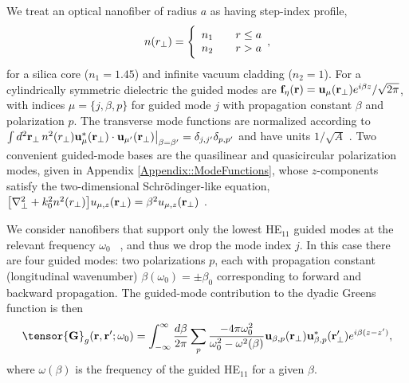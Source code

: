 \documentclass[preprint, aps,pra,onecolumn]{revtex4-1} %
\newcommand{\fidx}{\eta}
\newcommand{\eigenf}{\mbf{f}_\fidx}
\begin{document}
We treat an optical nanofiber of radius $a$ as having step-index profile,
	\begin{align} \label{Eq::IndexofRefraction}
		n(r_\perp) = \Bigg\{  
			\begin{array}{l l} n_1 & \quad r \leq a \\
						 n_2 & \quad r > a 
		\end{array},
	\end{align}
for a silica core ($n_1 = 1.45$) and infinite vacuum cladding ($n_2 = 1$).  For a cylindrically symmetric dielectric the guided modes are $\eigenf (\br) = \mathbf{u}_\mu (\br_\perp) e^{i\beta z}/\sqrt{2 \pi}$, with indices $\mu=\{j, \beta, p\}$ for guided mode $j$ with propagation constant $\beta$ and polarization $p$.  The transverse mode functions are normalized according to $\int d^2 \mathbf{r}_\perp \, n^2(r_\perp)\mathbf{u}^*_\mu (\mathbf{r}_\perp) \cdot \mathbf{u}_{\mu'} (\mathbf{r}_\perp)\big|_{\beta = \beta'} = \delta_{j,j'}\delta_{p,p'}$ and have units $1/\sqrt{A}$ \cite{le_kien_anisotropy_2014}.  Two convenient guided-mode bases are the quasilinear and quasicircular polarization modes, given in  Appendix \ref{Appendix::ModeFunctions}, whose $z$-components satisfy the two-dimensional Schr\"{o}dinger-like equation, $\big[\nabla_\perp^2 +k_0^2 n^2(r_\perp) \big] u_{\mu,z} (\mathbf{r}_\perp) = \beta^2 u_{\mu,z} (\mathbf{r}_\perp)$ \cite{kien_field_2004}.  

We consider nanofibers that support only the lowest HE$_{11}$ guided modes at the relevant frequency $\omega_0$ ~\cite{Yariv}, and thus we drop the mode index $j$.  In this case there are four guided modes: two polarizations $p$, each with propagation constant (longitudinal wavenumber) $\beta(\omega_0) = \pm\beta_0$ corresponding to forward and backward propagation.  The guided-mode contribution to the dyadic Greens function is then 
	\begin{equation} \label{Eq::GreensEigenmodes}
		\tensor{\mathbf{G}}_g(\br,\br'; \omega_0) = \int_{-\infty}^\infty \frac{d \beta}{2 \pi} \sum_{p} 
\frac{-4\pi\omega_0^2}{\omega_0^2-\omega^2(\beta)} \mathbf{u}_{\beta,p} (\br_\perp)\mathbf{u}^*_{\beta,p} 
(\br_{\perp}^\prime) e^{i\beta(z-z')},
	\end{equation}
where $ \omega(\beta)$ is the frequency of the guided HE$_{11}$ for a given $\beta$.  
\end{document}
